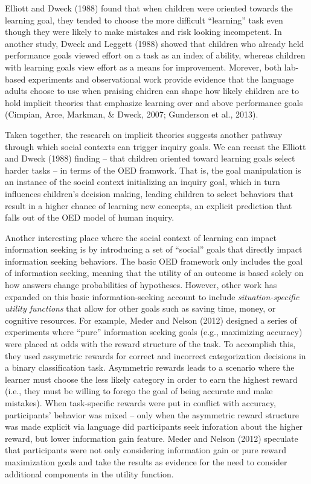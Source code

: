 \documentclass[english,floatsintext,man]{apa6}
\theoremstyle{definition}
\theoremstyle{definition}
\theoremstyle{definition}
\theoremstyle{remark}
\begin{document}
\noindent
Elliott and Dweck (1988) found that when children were oriented towards
the learning goal, they tended to choose the more difficult
\enquote{learning} task even though they were likely to make mistakes
and risk looking incompetent. In another study, Dweck and Leggett (1988)
showed that children who already held performance goals viewed effort on
a task as an index of ability, whereas children with learning goals view
effort as a means for improvement. Morever, both lab-based experiments
and observational work provide evidence that the language adults choose
to use when praising chidren can shape how likely children are to hold
implicit theories that emphasize learning over and above performance
goals (Cimpian, Arce, Markman, \& Dweck, 2007; Gunderson et al., 2013).

Taken together, the research on implicit theories suggests another
pathway through which social contexts can trigger inquiry goals. We can
recast the Elliott and Dweck (1988) finding -- that children oriented
toward learning goals select harder tasks -- in terms of the OED
framwork. That is, the goal manipulation is an instance of the social
context initializing an inquiry goal, which in turn influences
children's decision making, leading children to select behaviors that
result in a higher chance of learning new concepts, an explicit
prediction that falls out of the OED model of human inquiry.

Another interesting place where the social context of learning can
impact information seeking is by introducing a set of \enquote{social}
goals that directly impact information seeking behaviors. The basic OED
framework only includes the goal of information seeking, meaning that
the utility of an outcome is based solely on how answers change
probabilities of hypotheses. However, other work has expanded on this
basic information-seeking account to include \emph{situation-specific
utility functions} that allow for other goals such as saving time,
money, or cognitive resources. For example, Meder and Nelson (2012)
designed a series of experiments where \enquote{pure} information
seeking goals (e.g., maximizing accuracy) were placed at odds with the
reward structure of the task. To accomplish this, they used assymetric
rewards for correct and incorrect categorization decisions in a binary
classification task. Asymmetric rewards leads to a scenario where the
learner must choose the less likely category in order to earn the
highest reward (i.e., they must be willing to forego the goal of being
accurate and make mistakes). When task-specific rewards were put in
conflict with accuracy, participants' behavior was mixed -- only when
the asymmetric reward structure was made explicit via language did
participants seek inforation about the higher reward, but lower
information gain feature. Meder and Nelson (2012) speculate that
participants were not only considering information gain or pure reward
maximization goals and take the results as evidence for the need to
consider additional components in the utility function.
\end{document}

